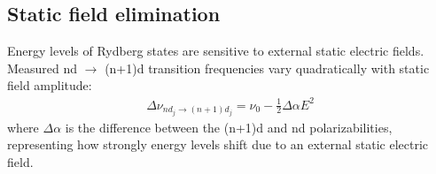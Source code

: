 \documentclass[landscape]{sciposter}
\begin{document}
\begin{multicols}{4}
\section*{\large Static field elimination}
Energy levels of Rydberg states are sensitive to external static electric fields. Measured nd $\rightarrow$ (n+1)d transition frequencies vary quadratically with static field amplitude:
\begin{align*}
\boxed{\Delta \nu_{nd_j \rightarrow (n+1)d_j} = \nu_{0} - \frac{1}{2} \Delta \alpha E^2}
\end{align*}
where $\Delta \alpha$ is the difference between the (n+1)d and nd polarizabilities, representing how strongly energy levels shift due to an external static electric field. 


\end{multicols}
\end{document}
